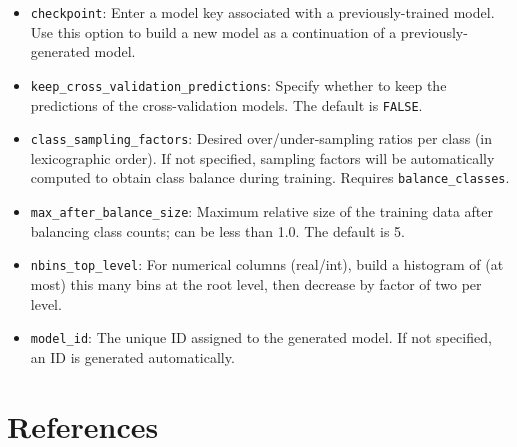 \begin{itemize}
\item {\texttt{checkpoint}}: Enter a model key associated with a previously-trained model. Use this option to build a new model as a continuation of a previously-generated model.
\item {\texttt{keep\_cross\_validation\_predictions}}: Specify whether to keep the predictions of the cross-validation models.   The default is {\texttt{FALSE}}.
\item {\texttt{class\_sampling\_factors}}: Desired over/under-sampling ratios per class (in lexicographic order). If not specified, sampling factors will be automatically computed to obtain class balance during training. Requires \texttt{balance\_classes}.
\item {\texttt{max\_after\_balance\_size}}: Maximum relative size of the training data after balancing class counts; can be less than 1.0.  The default is 5.
\item {\texttt{nbins\_top\_level}}: For numerical columns (real/int), build a histogram of (at most) this many bins at the root level, then decrease by factor of two per level.
\item \texttt{model\_id}: The unique ID assigned to the generated model. If not specified, an ID is generated automatically.
\end{itemize}

\newpage
\section{References}












